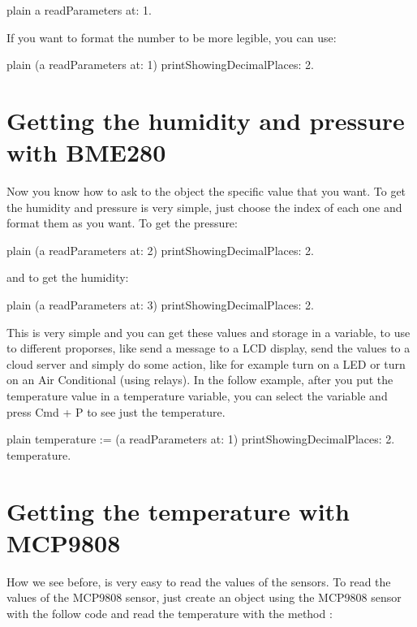 \documentclass[10pt,twoside,english]{_support/latex/sbabook/sbabook}
\begin{document}
\begin{displaycode}{plain}
a readParameters at: 1.
\end{displaycode}

If you want to format the number to be more legible, you can use:

\begin{displaycode}{plain}
(a readParameters at: 1) printShowingDecimalPlaces: 2.
\end{displaycode}
\section{Getting the humidity and pressure with BME280}
Now you know how to ask to the object the specific value that you want. To get the humidity and pressure is very simple, just choose the index of each one and format them as you want. To get the pressure:

\begin{displaycode}{plain}
(a readParameters at: 2) printShowingDecimalPlaces: 2.
\end{displaycode}

and to get the humidity:

\begin{displaycode}{plain}
(a readParameters at: 3) printShowingDecimalPlaces: 2.
\end{displaycode}

This is very simple and you can get these values and storage in a variable, to use to different proporses, like send a message to a LCD display, send the values to a cloud server and simply do some action, like for example turn on a LED or turn on an Air Conditional (using relays). In the follow example, after you put the temperature value in a temperature variable, you can select the variable and press Cmd + P to see just the temperature. 

\begin{displaycode}{plain}
temperature := (a readParameters at: 1) printShowingDecimalPlaces: 2.
temperature.
\end{displaycode}
\section{Getting the temperature with MCP9808}
How we see before, is very easy to read the values of the sensors. To read the values of the MCP9808 sensor, just create an object using the MCP9808 sensor with the follow code and read the temperature with the method :
\end{document}
